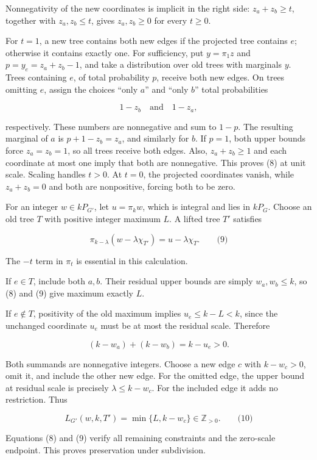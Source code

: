 \documentclass{article}
\begin{document}
Nonnegativity of the new coordinates is implicit in the right side: \(z_a+z_b\ge t\), together with \(z_a,z_b\le t\), gives \(z_a,z_b\ge0\) for every \(t\ge0\).

For \(t=1\), a new tree contains both new edges if the projected tree contains \(e\); otherwise it contains exactly one. For sufficiency, put \(y=\pi_1z\) and \(p=y_e=z_a+z_b-1\), and take a distribution over old trees with marginals \(y\). Trees containing \(e\), of total probability \(p\), receive both new edges. On trees omitting \(e\), assign the choices ``only \(a\)'' and ``only \(b\)'' total probabilities

\[
1-z_b\quad\text{and}\quad1-z_a,
\]

respectively. These numbers are nonnegative and sum to \(1-p\). The resulting marginal of \(a\) is \(p+1-z_b=z_a\), and similarly for \(b\). If \(p=1\), both upper bounds force \(z_a=z_b=1\), so all trees receive both edges. Also, \(z_a+z_b\ge1\) and each coordinate at most one imply that both are nonnegative. This proves (8) at unit scale. Scaling handles \(t\gt 0\). At \(t=0\), the projected coordinates vanish, while \(z_a+z_b=0\) and both are nonpositive, forcing both to be zero.

For an integer \(w\in kP_{G'}\), let \(u=\pi_k w\), which is integral and lies in \(kP_G\). Choose an old tree \(T\) with positive integer maximum \(L\). A lifted tree \(T'\) satisfies

\[
\pi_{k-\lambda}(w-\lambda\chi_{T'})=u-\lambda\chi_T.\qquad\text{(9)}
\]

The \(-t\) term in \(\pi_t\) is essential in this calculation.

If \(e\in T\), include both \(a,b\). Their residual upper bounds are simply \(w_a,w_b\le k\), so (8) and (9) give maximum exactly \(L\).

If \(e\notin T\), positivity of the old maximum implies \(u_e\le k-L\lt k\), since the unchanged coordinate \(u_e\) must be at most the residual scale. Therefore

\[
(k-w_a)+(k-w_b)=k-u_e\gt 0.
\]

Both summands are nonnegative integers. Choose a new edge \(c\) with \(k-w_c\gt 0\), omit it, and include the other new edge. For the omitted edge, the upper bound at residual scale is precisely \(\lambda\le k-w_c\). For the included edge it adds no restriction. Thus

\[
L_{G'}(w,k,T')=\min\{L,k-w_c\}\in\mathbb Z_{\gt 0}.\qquad\text{(10)}
\]

Equations (8) and (9) verify all remaining constraints and the zero-scale endpoint. This proves preservation under subdivision.
\end{document}
